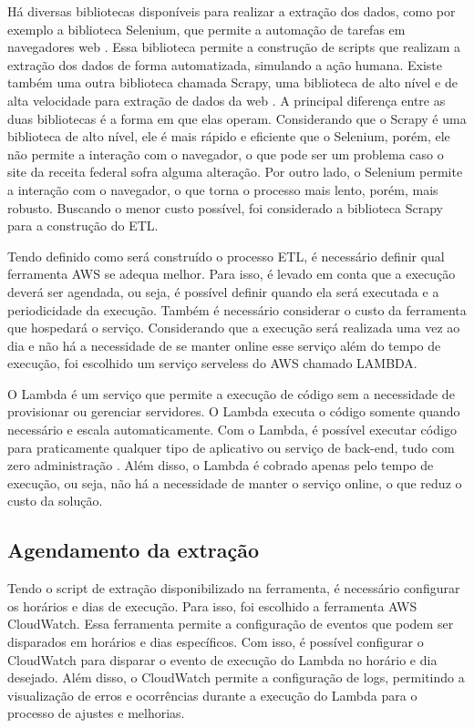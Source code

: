 Há diversas bibliotecas disponíveis para realizar a extração dos dados, como por exemplo a biblioteca Selenium, que permite a automação de tarefas em navegadores web \cite{Selenium}. Essa biblioteca permite a construção de scripts que realizam a extração dos dados de forma automatizada, simulando a ação humana. Existe também uma outra biblioteca chamada Scrapy, uma biblioteca de alto nível e de alta velocidade para extração de dados da web \cite{Scrapy}. A principal diferença entre as duas bibliotecas é a forma em que elas operam. Considerando que o Scrapy é uma biblioteca de alto nível, ele é mais rápido e eficiente que o Selenium, porém, ele não permite a interação com o navegador, o que pode ser um problema caso o site da receita federal sofra alguma alteração. Por outro lado, o Selenium permite a interação com o navegador, o que torna o processo mais lento, porém, mais robusto. Buscando o menor custo possível, foi considerado a biblioteca Scrapy para a construção do ETL.

Tendo definido como será construído o processo ETL, é necessário definir qual ferramenta AWS se adequa melhor. Para isso, é levado em conta que a execução deverá ser agendada, ou seja, é possível definir quando ela será executada e a periodicidade da execução. Também é necessário considerar o custo da ferramenta que hospedará o serviço. Considerando que a execução será realizada uma vez ao dia e não há a necessidade de se manter online esse serviço além do tempo de execução, foi escolhido um serviço serveless do AWS chamado LAMBDA.

O Lambda é um serviço que permite a execução de código sem a necessidade de provisionar ou gerenciar servidores. O Lambda executa o código somente quando necessário e escala automaticamente. Com o Lambda, é possível executar código para praticamente qualquer tipo de aplicativo ou serviço de back-end, tudo com zero administração \cite{Lambda}. Além disso, o Lambda é cobrado apenas pelo tempo de execução, ou seja, não há a necessidade de manter o serviço online, o que reduz o custo da solução.

\subsection{Agendamento da extração}

Tendo o script de extração disponibilizado na ferramenta, é necessário configurar os horários e dias de execução. Para isso, foi escolhido a ferramenta AWS CloudWatch. Essa ferramenta permite a configuração de eventos que podem ser disparados em horários e dias específicos. Com isso, é possível configurar o CloudWatch para disparar o evento de execução do Lambda no horário e dia desejado. Além disso, o CloudWatch permite a configuração de logs, permitindo a visualização de erros e ocorrências durante a execução do Lambda para o processo de ajustes e melhorias.

